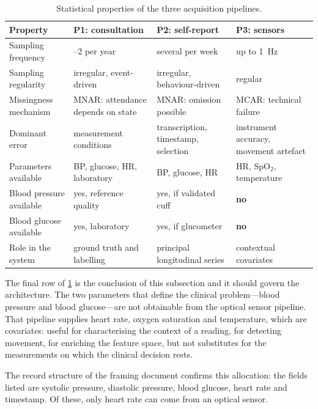 \documentclass[12pt,a4paper,oneside]{report}
\begin{document}
\begin{table}[htbp]
\centering\footnotesize
\caption{Statistical properties of the three acquisition pipelines.}\label{tab:pipelines}
\begin{tabularx}{\textwidth}{@{}>{\raggedright\arraybackslash}p{3.1cm} >{\raggedright\arraybackslash}X >{\raggedright\arraybackslash}X >{\raggedright\arraybackslash}X@{}}
\toprule
\textbf{Property} & \textbf{P1: consultation} & \textbf{P2: self-report} & \textbf{P3: sensors} \\
\midrule
Sampling frequency & 1--2 per year & several per week & up to 1~Hz \\
Sampling regularity & irregular, event-driven & irregular, behaviour-driven & regular \\
Missingness mechanism & MNAR: attendance depends on state & MNAR: omission possible & MCAR: technical failure \\
Dominant error & measurement conditions & transcription, timestamp, selection & instrument accuracy, movement artefact \\
Parameters available & BP, glucose, HR, laboratory & BP, glucose, HR & HR, SpO$_2$, temperature \\
Blood pressure available & yes, reference quality & yes, if validated cuff & \textbf{no} \\
Blood glucose available & yes, laboratory & yes, if glucometer & \textbf{no} \\
Role in the system & ground truth and labelling & principal longitudinal series & contextual covariates \\
\bottomrule
\end{tabularx}
\end{table}

The final row of \cref{tab:pipelines} is the conclusion of this subsection and it should govern the architecture. The two parameters that define the clinical problem---blood pressure and blood glucose---are not obtainable from the optical sensor pipeline. That pipeline supplies heart rate, oxygen saturation and temperature, which are covariates: useful for characterising the context of a reading, for detecting movement, for enriching the feature space, but not substitutes for the measurements on which the clinical decision rests.

The record structure of the framing document confirms this allocation: the fields listed are systolic pressure, diastolic pressure, blood glucose, heart rate and timestamp. Of these, only heart rate can come from an optical sensor.
\end{document}
